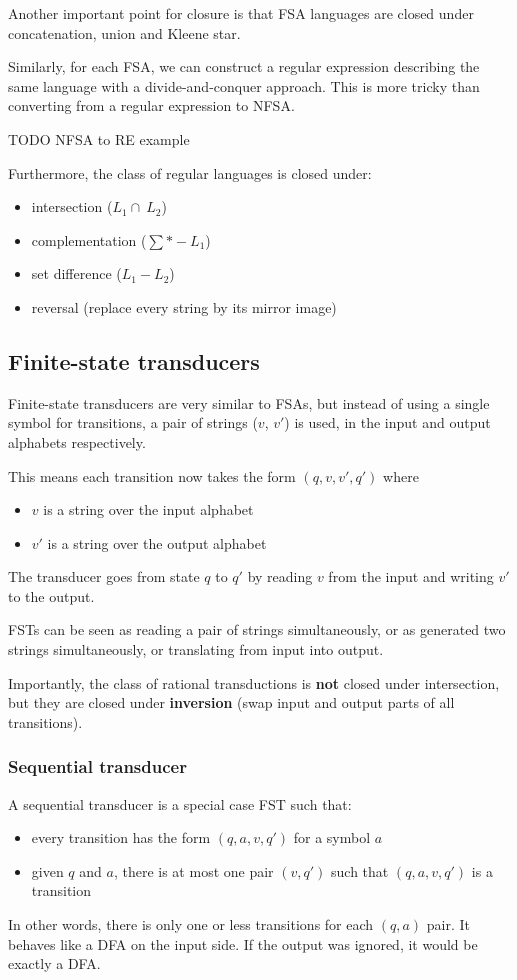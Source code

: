 \documentclass[Report.tex]{subfiles}
\begin{document}
Another important point for closure is that FSA languages are
closed under concatenation, union and Kleene star.

Similarly, for each FSA, we can construct a regular expression describing
the same language with a divide-and-conquer approach. This is more
tricky than converting from a regular expression to NFSA.

TODO NFSA to RE example

Furthermore, the class of regular languages is closed under:
\begin{itemize}
\item intersection ($L_1 \cap\ L_2$)
\item complementation ($\sum *  - L_1$)
\item set difference ($L_1 - L_2$)
\item reversal (replace every string by its mirror image)
\end{itemize}

\subsection{Finite-state transducers}
Finite-state transducers are very similar to FSAs, but instead of using a single
symbol for transitions, a pair of strings ($v$, $v'$) is used, in the input
and output alphabets respectively.

This means each transition now takes the form $(q, v, v', q')$ where
\begin{itemize}
\item $v$ is a string over the input alphabet
\item $v'$ is a string over the output alphabet
\end{itemize}
The transducer goes from state $q$ to $q'$ by reading $v$ from the input
and writing $v'$ to the output.

FSTs can be seen as reading a pair of strings simultaneously, or as 
generated two strings simultaneously, or translating from input into output. 

Importantly, the class of rational transductions is \textbf{not} closed under
intersection, but they are closed under \textbf{inversion} (swap input
and output parts of all transitions).

\subsubsection{Sequential transducer}
A sequential transducer is a special case FST such that:
\begin{itemize}
\item every transition has the form $(q,a,v,q')$ for a symbol $a$
\item given $q$ and $a$, there is at most one pair $(v, q')$ such that
$(q, a, v, q')$ is a transition
\end{itemize}
In other words, there is only one or less transitions for each $(q, a)$ pair.
It behaves like a DFA on the input side. If the output was ignored,
it would be exactly a DFA.
\end{document}
